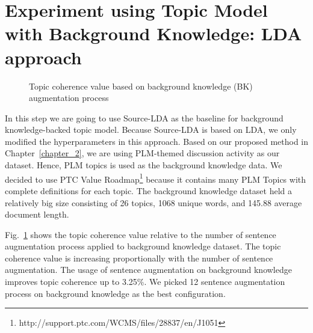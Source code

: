 \documentclass[senior]{IPSstyle}
\begin{document}
\section{Experiment using Topic Model with Background Knowledge: LDA approach}
\label{sec_elda}

\begin{figure}[h]
	\centering
	\caption{Topic coherence value based on background knowledge (BK) augmentation process}
\label{fig_tme2}
\end{figure}

In this step we are going to use Source-LDA as the baseline for background knowledge-backed topic model. Because Source-LDA is based on LDA, we only modified the hyperparameters in this approach. Based on our proposed method in Chapter~\ref{chapter_2}, we are using PLM-themed discussion activity as our dataset. Hence, PLM topics is used as the background knowledge data. We decided to use PTC Value Roadmap\footnote{http://support.ptc.com/WCMS/files/28837/en/J1051} because it contains many PLM Topics with complete definitions for each topic. The background knowledge dataset held a relatively big size consisting of 26 topics, 1068 unique words, and 145.88 average document length.

Fig.~\ref{fig_tme2} shows the topic coherence value relative to the number of sentence augmentation process applied to background knowledge dataset. The topic coherence value is increasing proportionally with the number of sentence augmentation. The usage of sentence augmentation on background knowledge improves topic coherence up to 3.25\%. We picked 12 sentence augmentation process on background knowledge as the best configuration.
\end{document}
